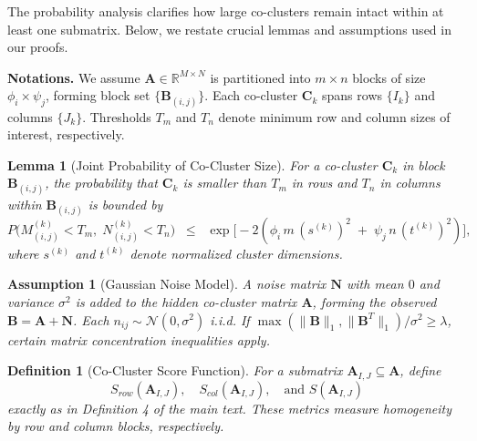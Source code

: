 \documentclass[journal]{IEEEtran}
\newtheorem{lemma}{Lemma}
\newtheorem{definition}{Definition}
\newtheorem{assumption}{Assumption}
\begin{document}
The probability analysis clarifies how large co-clusters remain intact within at least one submatrix. Below, we restate crucial lemmas and assumptions used in our proofs.

\noindent\textbf{Notations.}
We assume \(\mathbf{A}\in \mathbb{R}^{M\times N}\) is partitioned into \(m\times n\) blocks of size \(\phi_i\times\psi_j\), forming block set \(\{\mathbf{B}_{(i,j)}\}\). Each co-cluster \(\mathbf{C}_k\) spans rows \(\{I_k\}\) and columns \(\{J_k\}\). Thresholds \(T_m\) and \(T_n\) denote minimum row and column sizes of interest, respectively.

\begin{lemma}[Joint Probability of Co-Cluster Size]
    \label{lemma:joint_prob_size}
    For a co-cluster \(\mathbf{C}_k\) in block \(\mathbf{B}_{(i,j)}\), the probability that \(\mathbf{C}_k\) is smaller than \(T_m\) in rows and \(T_n\) in columns within \(\mathbf{B}_{(i,j)}\) is bounded by
    \begin{equation}
        P\bigl(M_{(i,j)}^{(k)} < T_m,\; N_{(i,j)}^{(k)} < T_n \bigr)\;\;\le\;\; \exp\bigl\lbrack -2(\phi_i\,m\,(s^{(k)})^2\;+\;\psi_j\,n\,(t^{(k)})^2)\bigr\rbrack ,
    \end{equation}
    where \(s^{(k)}\) and \(t^{(k)}\) denote normalized cluster dimensions.
\end{lemma}

\begin{assumption}[Gaussian Noise Model]
    \label{assump:gaussian_noise}
    A noise matrix \(\mathbf{N}\) with mean \(0\) and variance \(\sigma^2\) is added to the hidden co-cluster matrix \(\mathbf{A}\), forming the observed \(\mathbf{B}=\mathbf{A}+\mathbf{N}\). Each \(n_{ij}\sim \mathcal{N}(0,\sigma^2)\) i.i.d. If \(\max(\|\mathbf{B}\|_1,\|\mathbf{B}^T\|_1)/\sigma^2\geq \lambda\), certain matrix concentration inequalities apply.
\end{assumption}

\begin{definition}[Co-Cluster Score Function]
    \label{def:cc_score}
    For a submatrix \(\mathbf{A}_{I,J}\subseteq\mathbf{A}\), define
    \begin{equation}
        S_{row}(\mathbf{A}_{I,J}),\quad S_{col}(\mathbf{A}_{I,J}),\quad \text{and } S(\mathbf{A}_{I,J})
    \end{equation}
    exactly as in Definition 4 of the main text. These metrics measure homogeneity by row and column blocks, respectively.
\end{definition}
\end{document}
